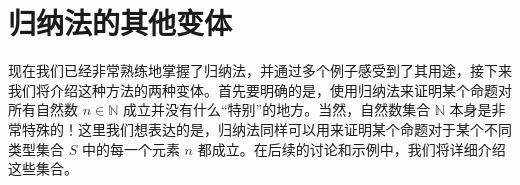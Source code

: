 \section{归纳法的其他变体}

现在我们已经非常熟练地掌握了归纳法，并通过多个例子感受到了其用途，接下来我们将介绍这种方法的两种变体。首先要明确的是，使用归纳法来证明某个命题对所有自然数 $n \in \mathbb{N}$ 成立并没有什么``特别''的地方。当然，自然数集合 $\mathbb{N}$ 本身是非常特殊的！这里我们想表达的是，归纳法同样可以用来证明某个命题对于某个不同类型集合 $S$ 中的每一个元素 $n$ 都成立。在后续的讨论和示例中，我们将详细介绍这些集合。







